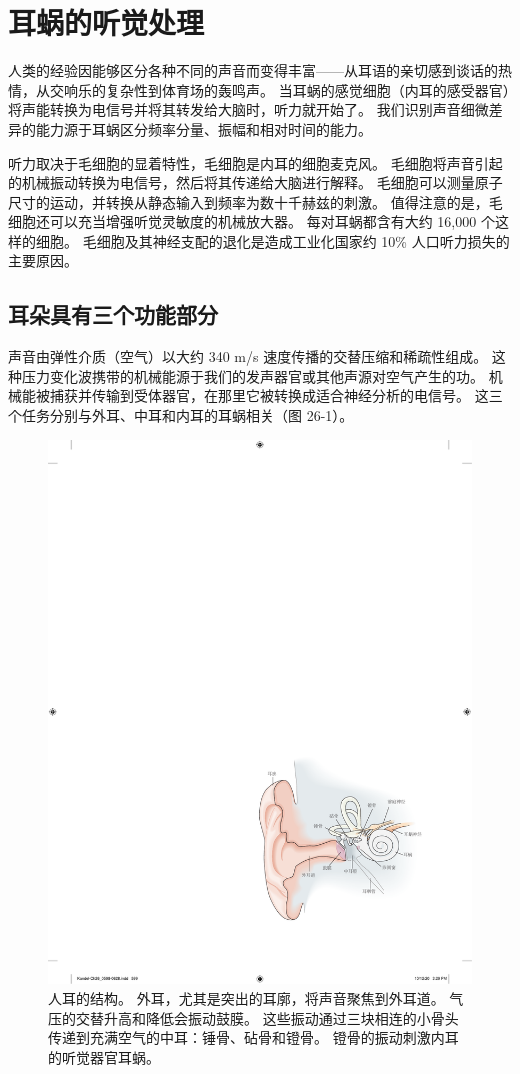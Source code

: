 \chapter{耳蜗的听觉处理}
人类的经验因能够区分各种不同的声音而变得丰富——从耳语的亲切感到谈话的热情，从交响乐的复杂性到体育场的轰鸣声。 
当耳蜗的感觉细胞（内耳的感受器官）将声能转换为电信号并将其转发给大脑时，听力就开始了。 
我们识别声音细微差异的能力源于耳蜗区分频率分量、振幅和相对时间的能力。

听力取决于毛细胞的显着特性，毛细胞是内耳的细胞麦克风。 
毛细胞将声音引起的机械振动转换为电信号，然后将其传递给大脑进行解释。 
毛细胞可以测量原子尺寸的运动，并转换从静态输入到频率为数十千赫兹的刺激。 
值得注意的是，毛细胞还可以充当增强听觉灵敏度的机械放大器。 
每对耳蜗都含有大约 16,000 个这样的细胞。 
毛细胞及其神经支配的退化是造成工业化国家约 10\% 人口听力损失的主要原因。



\section{耳朵具有三个功能部分}
声音由弹性介质（空气）以大约 340 m/s 速度传播的交替压缩和稀疏性组成。 
这种压力变化波携带的机械能源于我们的发声器官或其他声源对空气产生的功。 
机械能被捕获并传输到受体器官，在那里它被转换成适合神经分析的电信号。 
这三个任务分别与外耳、中耳和内耳的耳蜗相关（图 26-1）。


\begin{figure}[htbp]
	\centering
	\includegraphics[width=0.5\linewidth]{chap26/fig_26_1}
	\caption{人耳的结构。 
		外耳，尤其是突出的耳廓，将声音聚焦到外耳道。 气压的交替升高和降低会振动鼓膜。 这些振动通过三块相连的小骨头传递到充满空气的中耳：锤骨、砧骨和镫骨。 
		镫骨的振动刺激内耳的听觉器官耳蜗。}
	\label{fig:26_1}
\end{figure}

